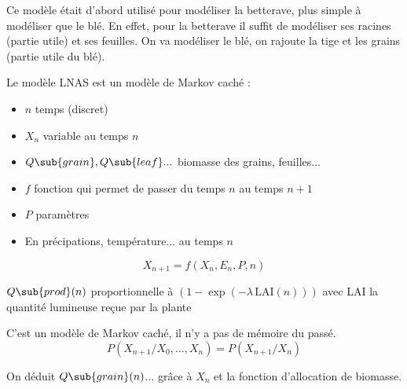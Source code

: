 Ce modèle était d'abord utilisé pour modéliser la betterave, 
plus simple à modéliser que le blé. 
En effet, pour la betterave il suffit de modéliser 
ses racines (partie utile) et ses feuilles.
On va modéliser le blé, on rajoute la tige et les grains (partie utile du blé).

Le modèle LNAS est un modèle de Markov caché : 
\begin{itemize}
  \item $n$  temps (discret)     
  \item $X_n$ variable au temps $n$       
  \item $Q\sub{grain}, Q\sub{leaf}... $ biomasse des grains, feuilles...      
  \item $f$ fonction qui permet de passer du temps $n$ au temps $n+1$     
  \item $P$ paramètres      
  \item En précipations, température... au temps $n$
\end{itemize}

\begin{equation}
  X_{n+1} = f(X_n,E_n,P,n)
\end{equation} 

$Q\sub{prod}(n)$ proportionnelle à $(1-\exp{(-\lambda \, \text{LAI}(n))})$ 
avec LAI la quantité lumineuse reçue par la plante

C’est un modèle de Markov caché, il n'y a pas de mémoire du passé.
\[
  P(X_{n+1}/X_0,…,X_n) = P(X_{n+1} / X_n) 
\] 

On déduit $Q\sub{grain}(n)$... grâce à $X_n$ et la fonction d'allocation de biomasse.



